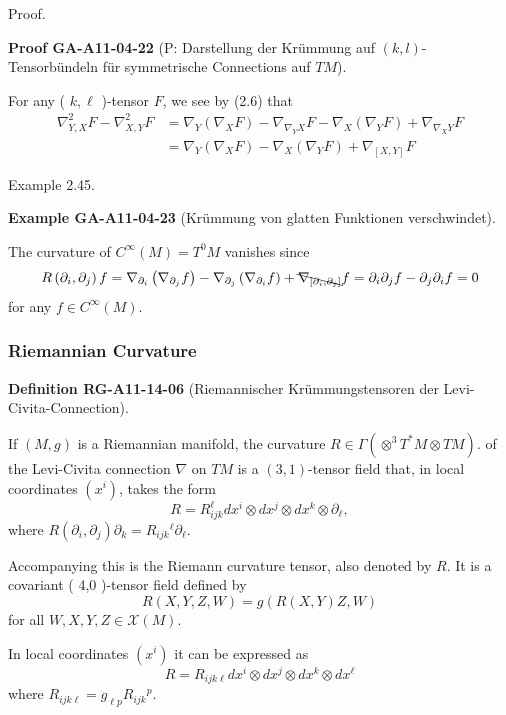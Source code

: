 \documentclass[10pt, letterpaper]{article}
\newcommand{\CustomHeading}[3]{%
  \par\medskip\noindent%
  \textbf{#1 #2} \textnormal{(#3)}.\enskip%
}
\newenvironment{DEF}[2]{\begin{unitbox}\CustomHeading{Definition}{#1}{#2}}{\end{unitbox}}
\newenvironment{EXA}[2]{\begin{unitbox}\CustomHeading{Example}{#1}{#2}}{\end{unitbox}}
\newenvironment{PROOF}[2]{\begin{unitbox}\CustomHeading{Proof}{#1}{#2}}{\end{unitbox}}
\begin{document}
Proof. 

\begin{PROOF}{GA-A11-04-22}{P: Darstellung der Krümmung auf $(k,l)$-Tensorbündeln für symmetrische Connections auf $TM$}
For any ( $k, \ell$ )-tensor $F$, we see by (2.6) that
$$
\begin{aligned}
\nabla_{Y, X}^{2} F-\nabla_{X, Y}^{2} F & =\nabla_{Y}\left(\nabla_{X} F\right)-\nabla_{\nabla_{Y} X} F-\nabla_{X}\left(\nabla_{Y} F\right)+\nabla_{\nabla_{X} Y} F \\
& =\nabla_{Y}\left(\nabla_{X} F\right)-\nabla_{X}\left(\nabla_{Y} F\right)+\nabla_{[X, Y]} F
\end{aligned}
$$
\end{PROOF}



Example 2.45. 


\begin{EXA}{GA-A11-04-23}{Krümmung von glatten Funktionen verschwindet}
The curvature of $C^{\infty}(M)=T^{0} M$ vanishes since
$$
R\left(\partial_{i}, \partial_{j}\right) f=\nabla_{\partial_{i}}\left(\nabla_{\partial_{j}} f\right)-\nabla_{\partial_{j}}\left(\nabla_{\partial_{i}} f\right)+\bcancel{\nabla_{\left[\partial_{i}, \partial_{j}\right]}} f=\partial_{i} \partial_{j} f-\partial_{j} \partial_{i} f=0
$$
for any $f \in C^{\infty}(M)$.
\end{EXA}




\subsubsection*{Riemannian Curvature}


\begin{DEF}{RG-A11-14-06}{Riemannischer Krümmungstensoren der Levi-Civita-Connection}
If $(M, g)$ is a Riemannian manifold, the curvature $R \in \Gamma\left(\otimes^{3} T^{*} M \otimes T M\right).$ of the Levi-Civita connection $\nabla$ on $T M$ is a $(3,1)$-tensor field that, in local coordinates $(x^{i})$, takes the form
$$
R=R_{i j k}^{\ell} d x^{i} \otimes d x^{j} \otimes d x^{k} \otimes \partial_{\ell},
$$
where $R\left(\partial_{i}, \partial_{j}\right) \partial_{k}=R_{i j k}{ }^{\ell} \partial_{\ell}$. 

Accompanying this is the Riemann curvature tensor, also denoted by $R$. It is a covariant ( 4,0 )-tensor field defined by
$$
R(X, Y, Z, W)=g(R(X, Y) Z, W)
$$
for all $W, X, Y, Z \in \mathscr{X}(M)$. 

In local coordinates $\left(x^{i}\right)$ it can be expressed as
$$
R=R_{i j k \ell} d x^{i} \otimes d x^{j} \otimes d x^{k} \otimes d x^{\ell}
$$
where $R_{i j k \ell}=g_{\ell p} R_{i j k}{ }^{p}$.
\end{DEF}
\end{document}
